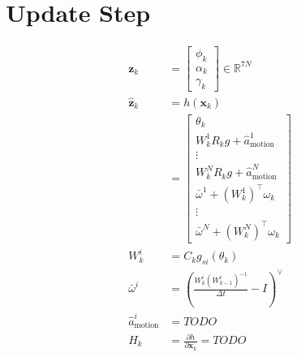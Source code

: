 \documentclass[11pt]{article}
\newcommand{\pd}[2]{\frac{\partial #1}{\partial #2}} %
\begin{document}
\section{Update Step}
\begin{align*}
    \mathbf{z}_k &= \begin{bmatrix}
        \phi_k \\ \alpha_k \\ \gamma_k
    \end{bmatrix} \in \mathbb{R}^{7N} \\
    \hat{\mathbf{z}}_k &= h(\mathbf{x}_k) \\
    &= \begin{bmatrix}
        \theta_k \\
        W_k^1 R_k g + \hat{a}^1_{\text{motion}} \\
        \vdots \\
        W_k^N R_k g + \hat{a}^N_{\text{motion}} \\
        \bar{\omega}^1 + (W_k^1)^\top \omega_k \\
        \vdots \\
        \bar{\omega}^N + (W_k^N)^\top \omega_k
    \end{bmatrix} \\
    W_k^i &= C_k g_{si}(\theta_k) \\
    \bar{\omega}^i &= \left(\frac{W_k^i(W_{k-1}^i)^{-1}}{\Delta t} - I\right)^\vee \\
    \hat{a}^i_{\text{motion}} &= TODO \\
    H_k &= \pd{h}{\mathbf{x}_k} = TODO \\
\end{align*}
\end{document}

